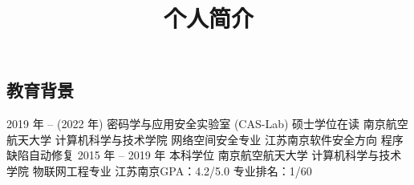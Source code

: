 \documentclass[11pt,a4paper,sans]{moderncv}   %
\title{个人简介}                     %
\begin{document}
\begin{CJK}{UTF8}{gbsn}                       %
\maketitle

\section{教育背景}
\cventry
{2019 年 -- (2022 年)}
{密码学与应用安全实验室 (CAS-Lab) 硕士学位在读}
{南京航空航天大学 计算机科学与技术学院 网络空间安全专业}
{江苏南京}{}{软件安全方向 程序缺陷自动修复 \newline{}}  %
\cventry
{2015 年 -- 2019 年}
{本科学位}
{南京航空航天大学 计算机科学与技术学院 物联网工程专业}
{江苏南京}{}{GPA：4.2/5.0 专业排名：1/60}




\end{CJK}
\end{document}
